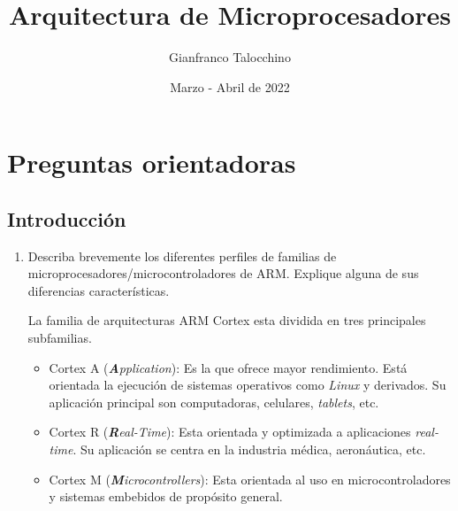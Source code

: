\documentclass[12pt, a4paper]{article}
\title{Arquitectura de Microprocesadores}
\author{Gianfranco Talocchino}
\date{Marzo - Abril de 2022}
\begin{document}
\maketitle

\section{Preguntas orientadoras}
\subsection{Introducción}
\begin{enumerate}
    \item Describa brevemente los diferentes perfiles de familias de 
    microprocesadores/microcontroladores de ARM. Explique alguna de sus 
    diferencias características.
    
    La familia de arquitecturas ARM Cortex esta dividida en tres 
    principales subfamilias.
    
    \begin{itemize}
        \item Cortex A (\emph{\textbf{A}pplication}): Es la que ofrece mayor rendimiento. Está 
        orientada la ejecución de sistemas operativos como \emph{Linux} y derivados. Su aplicación
        principal son computadoras, celulares, \emph{tablets}, etc.
        \item Cortex R (\emph{\textbf{R}eal-Time}): Esta orientada y optimizada a aplicaciones 
        \emph{real-time}. Su aplicación se centra en la industria médica, aeronáutica, etc.
        \item Cortex M (\emph{\textbf{M}icrocontrollers}): Esta orientada al uso en 
        microcontroladores y sistemas embebidos de propósito general.
    \end{itemize}
\end{enumerate}
\end{document}
